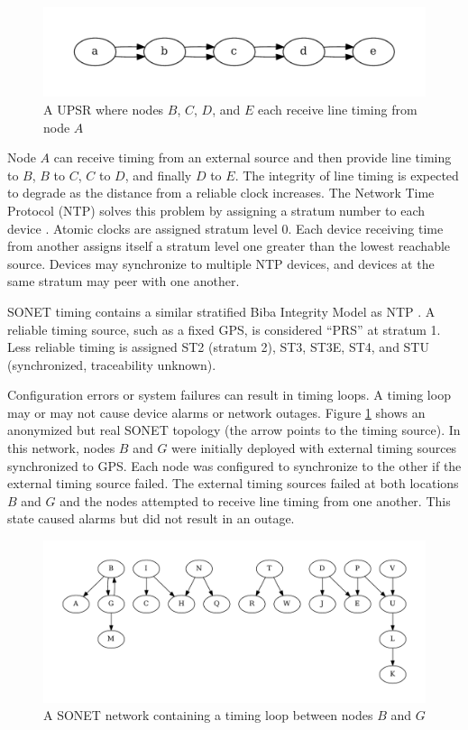 \documentclass{book}
\begin{document}
\begin{figure}[H]
\centering
\includegraphics[width=\columnwidth]{ch-dag/abcde}
\caption{A UPSR where nodes $B$, $C$, $D$, and $E$ each receive line timing from node $A$}
\end{figure}

Node $A$ can receive timing from an external source and then provide line timing to $B$, $B$ to $C$, $C$ to $D$, and finally $D$ to $E$. The integrity of line timing is expected to degrade as the distance from a reliable clock increases. The Network Time Protocol (NTP) solves this problem by assigning a stratum number to each device \cite{rfc1305}. Atomic clocks are assigned stratum level 0. Each device receiving time from another assigns itself a stratum level one greater than the lowest reachable source. Devices may synchronize to multiple NTP devices, and devices at the same stratum may peer with one another.

SONET timing contains a similar stratified Biba Integrity Model as NTP \cite{biba1977integrity}. A reliable timing source, such as a fixed GPS, is considered ``PRS'' at stratum 1. Less reliable timing is assigned ST2 (stratum 2), ST3, ST3E, ST4, and STU (synchronized, traceability unknown).

Configuration errors or system failures can result in timing loops. A timing loop may or may not cause device alarms or network outages. Figure \ref{loop} shows an anonymized but real SONET topology (the arrow points to the timing source). In this network, nodes $B$ and $G$ were initially deployed with external timing sources synchronized to GPS. Each node was configured to synchronize to the other if the external timing source failed. The external timing sources failed at both locations $B$ and $G$ and the nodes attempted to receive line timing from one another. This state caused alarms but did not result in an outage. 

\begin{figure}
\centering
\includegraphics[width=\columnwidth]{ch-dag/loop}
\caption{A SONET network containing a timing loop between nodes $B$ and $G$}
\label{loop}
\end{figure}
\end{document}
